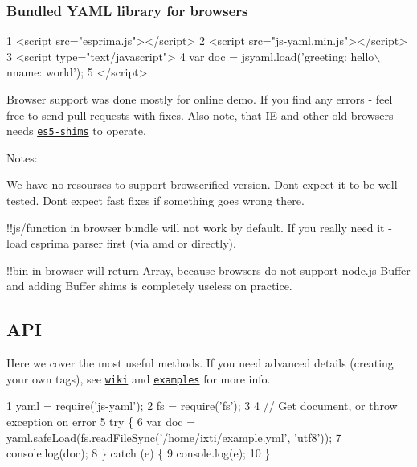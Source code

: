 \subsubsection*{Bundled Y\+A\+M\+L library for browsers}


\begin{DoxyCode}
1 <script src="esprima.js"></script>
2 <script src="js-yaml.min.js"></script>
3 <script type="text/javascript">
4 var doc = jsyaml.load('greeting: hello\(\backslash\)nname: world');
5 </script>
\end{DoxyCode}


Browser support was done mostly for online demo. If you find any errors -\/ feel free to send pull requests with fixes. Also note, that I\+E and other old browsers needs \href{https://github.com/kriskowal/es5-shim}{\tt es5-\/shims} to operate.

Notes\+:


\begin{DoxyEnumerate}
\item We have no resourses to support browserified version. Don\textquotesingle{}t expect it to be well tested. Don\textquotesingle{}t expect fast fixes if something goes wrong there.
\item {\ttfamily !!js/function} in browser bundle will not work by default. If you really need it -\/ load {\ttfamily esprima} parser first (via amd or directly).
\item {\ttfamily !!bin} in browser will return {\ttfamily Array}, because browsers do not support node.\+js {\ttfamily Buffer} and adding Buffer shims is completely useless on practice.
\end{DoxyEnumerate}

\subsection*{A\+P\+I }

Here we cover the most \textquotesingle{}useful\textquotesingle{} methods. If you need advanced details (creating your own tags), see \href{https://github.com/nodeca/js-yaml/wiki}{\tt wiki} and \href{https://github.com/nodeca/js-yaml/tree/master/examples}{\tt examples} for more info.


\begin{DoxyCode}
1 yaml = require('js-yaml');
2 fs   = require('fs');
3 
4 // Get document, or throw exception on error
5 try \{
6   var doc = yaml.safeLoad(fs.readFileSync('/home/ixti/example.yml', 'utf8'));
7   console.log(doc);
8 \} catch (e) \{
9   console.log(e);
10 \}
\end{DoxyCode}


